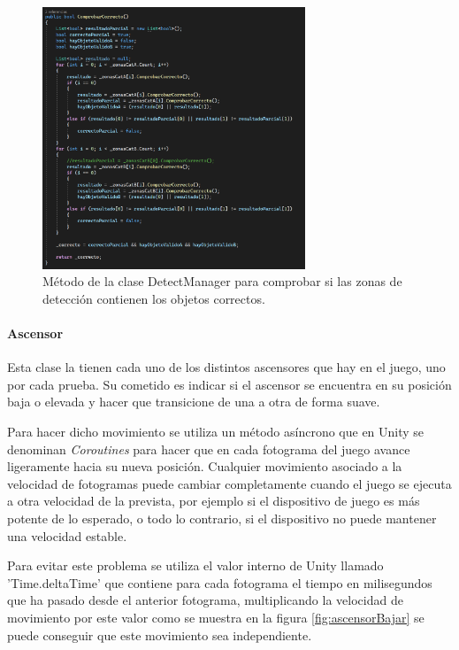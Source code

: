 \begin{figure}
	\centering
	\includegraphics[width=0.7\textwidth]{04.Desarrollo/05.Entrega5/01.Iteracion5_1/00.Figuras/20.detect_correcto.png}
	\caption{Método de la clase DetectManager para comprobar si las zonas de detección contienen los objetos correctos.}
	\label{fig:detectCorrecto}
\end{figure}




\paragraph{Ascensor}
Esta clase la tienen cada uno de los distintos ascensores que hay en el juego, uno por cada prueba. Su cometido es indicar si el ascensor se encuentra en su posición baja o elevada y hacer que transicione de una a otra de forma suave. 

Para hacer dicho movimiento se utiliza un método asíncrono que en Unity se denominan \textit{Coroutines} para hacer que en cada fotograma del juego avance ligeramente hacia su nueva posición. Cualquier movimiento asociado a la velocidad de fotogramas puede cambiar completamente cuando el juego se ejecuta a otra velocidad de la prevista, por ejemplo si el dispositivo de juego es más potente de lo esperado, o todo lo contrario, si el dispositivo no puede mantener una velocidad estable. 

Para evitar este problema se utiliza el valor interno de Unity llamado 'Time.deltaTime' que contiene para cada fotograma el tiempo en milisegundos que ha pasado desde el anterior fotograma, multiplicando la velocidad de movimiento por este valor como se muestra en la figura \ref{fig:ascensorBajar} se puede conseguir que este movimiento sea independiente. 

